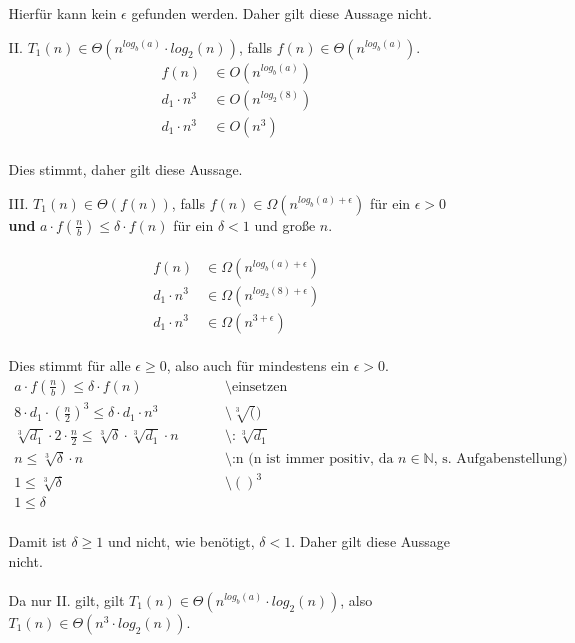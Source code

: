 \documentclass{article}
\begin{document}
\begin{enumerate}
\begin{enumerate}
   	    Hierfür kann kein $\epsilon$ gefunden werden. Daher gilt diese Aussage nicht.\\
   	    \item[II.]
   	    $T_1(n) \in \Theta (n^{log_b(a)} \cdot log_2(n))$, falls $f(n) \in \Theta (n^{log_b(a)})$.\\
   	    \[
   	        \begin{array}{ll}
   	            f(n) &\in O(n^{log_b(a)})\\
   	            d_1\cdot n^3 &\in O(n^{log_2(8)})\\
   	            d_1\cdot n^3 &\in O(n^3)
   	        \end{array}
   	    \]
   	    \\
   	    Dies stimmt, daher gilt diese Aussage.
   	    \item[III.]
   	    $T_1(n) \in \Theta (f(n))$, falls $f(n) \in \Omega (n^{log_b(a)+ \epsilon})$ für ein $\epsilon > 0$ \textbf{und} $a \cdot f(\frac{n}{b}) \leq \delta \cdot f(n)$ für ein $\delta < 1$ und große $n$.\\
   	    \\
   	    \[
   	        \begin{array}{ll}
   	            f(n) &\in \Omega (n^{log_b(a)+ \epsilon})\\
   	            d_1\cdot n^3 &\in \Omega (n^{log_2(8)+ \epsilon})\\
   	            d_1\cdot n^3 &\in \Omega (n^{3+ \epsilon})
   	        \end{array}
   	    \]
   	    \\
   	    Dies stimmt für alle $\epsilon \geq 0$, also auch für mindestens ein $\epsilon > 0$.
   	    \[
   	        \begin{array}{lll}
   	            a \cdot f(\frac{n}{b}) \leq \delta \cdot f(n)~~~~~~~~~~~~~~~~~~~~~~~&\text{\textbackslash einsetzen}\\
   	            8 \cdot d_1\cdot (\frac{n}{2})^3 \leq \delta \cdot d_1\cdot n^3 &\text{\textbackslash $\sqrt[3]()$}\\
   	            \sqrt[3]{d_1}\cdot 2 \cdot \frac{n}{2} \leq \sqrt[3]{\delta}\cdot \sqrt[3]{d_1} \cdot n & \text{\textbackslash $:\sqrt[3]{d_1}$}\\
   	            n \leq \sqrt[3]{\delta} \cdot n &\text{\textbackslash :n    (n ist immer positiv, da $n \in \mathbb{N}$, s. Aufgabenstellung)}\\
   	            1 \leq \sqrt[3]{\delta} &\text{\textbackslash $()^3$}\\
   	            1 \leq \delta
   	        \end{array}
   	    \]
   	    \\
   	    Damit ist $\delta \geq 1$ und nicht, wie benötigt, $\delta < 1$. Daher gilt diese Aussage nicht.
   	    \\\\
   	    Da nur II. gilt, gilt $T_1(n) \in \Theta (n^{log_b(a)} \cdot log_2(n))$, also $T_1(n) \in \Theta (n^3 \cdot log_2(n))$.
   	\end{enumerate}
   	

\end{enumerate}
\end{document}
